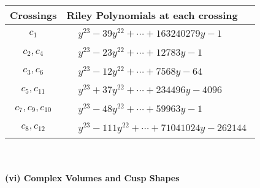 \documentclass[1p]{elsarticle_modified}
\theoremstyle{definition}
\begin{document}
\begin{tabular}{m{50pt}|m{274pt}}
Crossings & \hspace{64pt}Riley Polynomials at each crossing \\
\hline $$\begin{aligned}c_{1}\end{aligned}$$&$\begin{aligned}
&y^{23}-39 y^{22}+\cdots+163240279 y-1
\end{aligned}$\\
\hline $$\begin{aligned}c_{2},c_{4}\end{aligned}$$&$\begin{aligned}
&y^{23}-23 y^{22}+\cdots+12783 y-1
\end{aligned}$\\
\hline $$\begin{aligned}c_{3},c_{6}\end{aligned}$$&$\begin{aligned}
&y^{23}-12 y^{22}+\cdots+7568 y-64
\end{aligned}$\\
\hline $$\begin{aligned}c_{5},c_{11}\end{aligned}$$&$\begin{aligned}
&y^{23}+37 y^{22}+\cdots+234496 y-4096
\end{aligned}$\\
\hline $$\begin{aligned}c_{7},c_{9},c_{10}\end{aligned}$$&$\begin{aligned}
&y^{23}-48 y^{22}+\cdots+59963 y-1
\end{aligned}$\\
\hline $$\begin{aligned}c_{8},c_{12}\end{aligned}$$&$\begin{aligned}
&y^{23}-111 y^{22}+\cdots+71041024 y-262144
\end{aligned}$\\
\hline
\end{tabular}\\~\\
\newpage\flushleft \textbf{(vi) Complex Volumes and Cusp Shapes}
\end{document}
